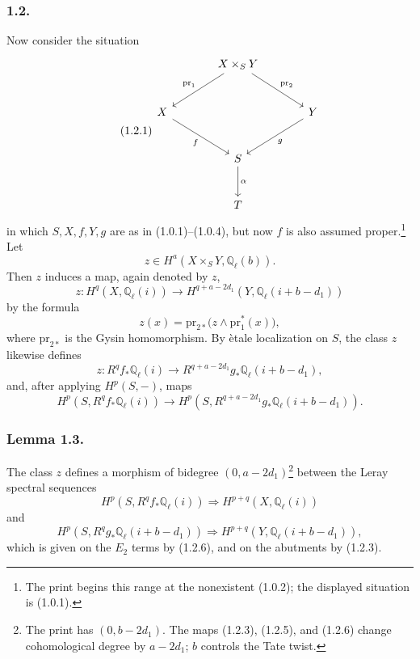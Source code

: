 \subsubsection*{1.2.}
Now consider the situation
\begin{equation}\tag{1.2.1}
\begin{tikzcd}[column sep=large, row sep=large]
{} & X\times_S Y \arrow[dl, "\mathrm{pr}_1"']
                  \arrow[dr, "\mathrm{pr}_2"] & {} \\
X \arrow[dr, "f"'] & {} & Y \arrow[dl, "g"] \\
{} & S \arrow[d, "\alpha"] & {} \\
{} & T & {}
\end{tikzcd}
\end{equation}
in which $S,X,f,Y,g$ are as in (1.0.1)--(1.0.4), but now $f$ is also
assumed proper.\footnote{The print begins this range at the nonexistent
(1.0.2); the displayed situation is (1.0.1).}  Let
\begin{equation}\tag{1.2.2}
z\in H^a(X\times_S Y,\mathbb Q_\ell(b)).
\end{equation}
Then $z$ induces a map, again denoted by $z$,
\begin{equation}\tag{1.2.3}
z:H^q(X,\mathbb Q_\ell(i))\longrightarrow
H^{q+a-2d_1}(Y,\mathbb Q_\ell(i+b-d_1))
\end{equation}
by the formula
\begin{equation}\tag{1.2.4}
z(x)=\mathrm{pr}_{2*}\bigl(z\wedge\mathrm{pr}_1^*(x)\bigr),
\end{equation}
where $\mathrm{pr}_{2*}$ is the Gysin homomorphism.  By \`etale localization
on $S$, the class $z$ likewise defines
\begin{equation}\tag{1.2.5}
z:R^qf_*\mathbb Q_\ell(i)\longrightarrow
R^{q+a-2d_1}g_*\mathbb Q_\ell(i+b-d_1),
\end{equation}
and, after applying $H^p(S,-)$, maps
\begin{equation}\tag{1.2.6}
H^p(S,R^qf_*\mathbb Q_\ell(i))\longrightarrow
H^p(S,R^{q+a-2d_1}g_*\mathbb Q_\ell(i+b-d_1)).
\end{equation}

\subsubsection*{Lemma 1.3.}
The class $z$ defines a morphism of bidegree
$(0,a-2d_1)$\footnote{The print has $(0,b-2d_1)$.  The maps (1.2.3),
(1.2.5), and (1.2.6) change cohomological degree by $a-2d_1$; $b$ controls
the Tate twist.} between the Leray spectral sequences
\begin{equation}\tag{1.2.7}
H^p(S,R^qf_*\mathbb Q_\ell(i))\Longrightarrow
H^{p+q}(X,\mathbb Q_\ell(i))
\end{equation}
and
\begin{equation}\tag{1.2.8}
H^p(S,R^qg_*\mathbb Q_\ell(i+b-d_1))\Longrightarrow
H^{p+q}(Y,\mathbb Q_\ell(i+b-d_1)),
\end{equation}
which is given on the $E_2$ terms by (1.2.6), and on the abutments by
(1.2.3).

